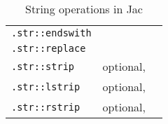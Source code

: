 {\begin{table}[t]
\begin{tabular}{l p{3cm} p{6cm}}
            \lstinline{.str::endswith}                            &                                                                                                                                                                &                      \\
            \lstinline{.str::replace}                             &                                                                                                                                                                &                      \\
            \lstinline{.str::strip}                               & optional,                                                                                                                                                      &                      \\
            \lstinline{.str::lstrip}                              & optional,                                                                                                                                                      &                      \\
            \lstinline{.str::rstrip}                              & optional,                                                                                                                                                      &                      \\
            \bottomrule
        \end{tabular}
        \caption{String operations in Jac}
        \label{tab:strops} %
    \end{table}
}

